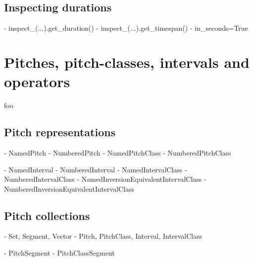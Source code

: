 \begin{comment}
<abjad>
Duration(1, 2) + Duration(3, 4)
Offset(1, 2) + Duration(3, 4)
Offset(7, 8) - Offset(1, 12)
</abjad>
\end{comment}

\subsection{Inspecting durations}

\begin{markdown}
-   inspect_(...).get_duration()
-   inspect_(...).get_timespan()
-   in_seconds=True
\end{markdown}

\section{Pitches, pitch-classes, intervals and operators}

foo

\subsection{Pitch representations}

\begin{markdown}
- NamedPitch
- NumberedPitch
- NamedPitchClass
- NumberedPitchClass
\end{markdown}

\begin{markdown}
- NamedInterval
- NumberedInterval
- NamedIntervalClass
- NumberedIntervalClass
- NamedInversionEquivalentIntervalClass
- NumberedInversionEquivalentIntervalClass
\end{markdown}

\subsection{Pitch collections}

\begin{markdown}
- Set, Segment, Vector
- Pitch, PitchClass, Interval, IntervalClass
\end{markdown}

\begin{markdown}
- PitchSegment
- PitchClassSegment
\end{markdown}

